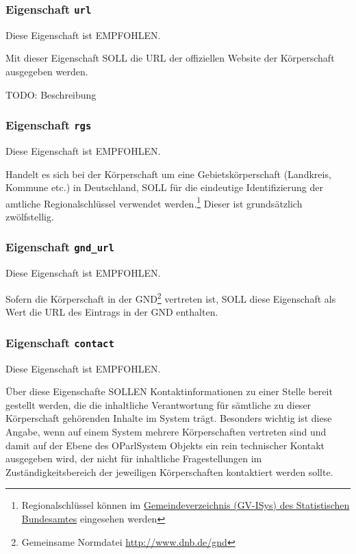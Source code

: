 \documentclass[,a4paper]{article}
\begin{document}
\subsubsection{Eigenschaft \texttt{url}}

Diese Eigenschaft ist EMPFOHLEN.

Mit dieser Eigenschaft SOLL die URL der offiziellen Website der
Körperschaft ausgegeben werden.

TODO: Beschreibung

\subsubsection{Eigenschaft \texttt{rgs}}

Diese Eigenschaft ist EMPFOHLEN.

Handelt es sich bei der Körperschaft um eine Gebietskörperschaft
(Landkreis, Kommune etc.) in Deutschland, SOLL für die eindeutige
Identifizierung der amtliche Regionalschlüssel verwendet
werden.\footnote{Regionalschlüssel können im
  \href{https://www.destatis.de/DE/ZahlenFakten/LaenderRegionen/Regionales/Gemeindeverzeichnis/Gemeindeverzeichnis.html}{Gemeindeverzeichnis
  (GV-ISys) des Statistischen Bundesamtes} eingesehen werden} Dieser ist
grundsätzlich zwölfstellig.

\subsubsection{Eigenschaft \texttt{gnd\_url}}

Diese Eigenschaft ist EMPFOHLEN.

Sofern die Körperschaft in der GND\footnote{Gemeinsame Normdatei
  \url{http://www.dnb.de/gnd}} vertreten ist, SOLL diese Eigenschaft als
Wert die URL des Eintrags in der GND enthalten.

\subsubsection{Eigenschaft \texttt{contact}}

Diese Eigenschaft ist EMPFOHLEN.

Über diese Eigenschafte SOLLEN Kontaktinformationen zu einer Stelle
bereit gestellt werden, die die inhaltliche Verantwortung für sämtliche
zu dieser Körperschaft gehörenden Inhalte im System trägt. Besonders
wichtig ist diese Angabe, wenn auf einem System mehrere Körperschaften
vertreten sind und damit auf der Ebene des OParlSystem Objekts ein rein
technischer Kontakt ausgegeben wird, der nicht für inhaltliche
Fragestellungen im Zuständigkeitsbereich der jeweiligen Körperschaften
kontaktiert werden sollte.
\end{document}
